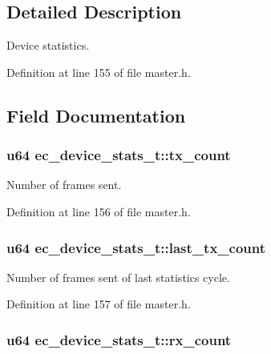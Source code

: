 \subsection{\-Detailed \-Description}
\-Device statistics. 

\-Definition at line 155 of file master.\-h.



\subsection{\-Field \-Documentation}
\subsubsection[{tx\-\_\-count}]{\setlength{\rightskip}{0pt plus 5cm}u64 {\bf ec\-\_\-device\-\_\-stats\-\_\-t\-::tx\-\_\-count}}\label{structec__device__stats__t_a712dc5c0b9652b59fe8dfda4cd5cb0fe}


\-Number of frames sent. 



\-Definition at line 156 of file master.\-h.

\subsubsection[{last\-\_\-tx\-\_\-count}]{\setlength{\rightskip}{0pt plus 5cm}u64 {\bf ec\-\_\-device\-\_\-stats\-\_\-t\-::last\-\_\-tx\-\_\-count}}\label{structec__device__stats__t_ab7ad452fd25c6e0470249165d8b5757f}


\-Number of frames sent of last statistics cycle. 



\-Definition at line 157 of file master.\-h.

\subsubsection[{rx\-\_\-count}]{\setlength{\rightskip}{0pt plus 5cm}u64 {\bf ec\-\_\-device\-\_\-stats\-\_\-t\-::rx\-\_\-count}}\label{structec__device__stats__t_aca29f0a6107eab8e7438ea53078183af}


